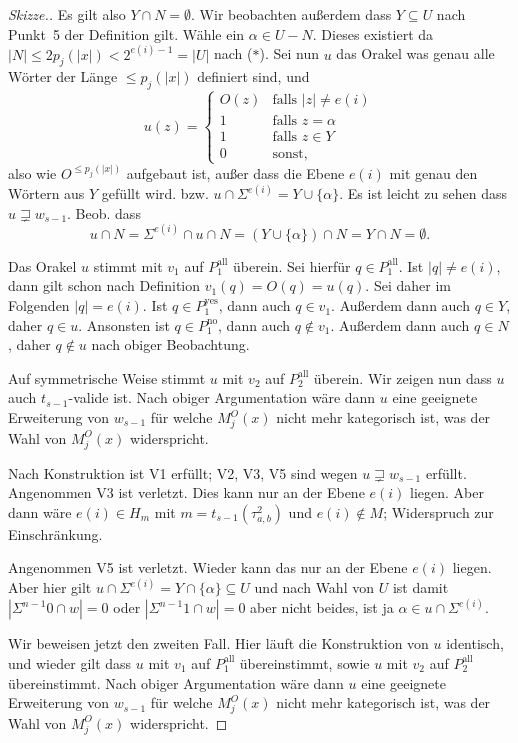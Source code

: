 \documentclass[nofonts]{uebung}
\begin{document}
\begin{proof}[Skizze.]
    Es gilt also $Y\cap N =\emptyset$. Wir beobachten außerdem dass $Y\subseteq U$ nach Punkt~5 der Definition gilt. Wähle ein $\alpha\in U-N$. Dieses existiert da $|N|\leq 2p_j(|x|)<2^{e(i)-1} = |U|$ nach ($\ast$).
    Sei nun $u$ das Orakel was genau alle Wörter der Länge $\leq p_j(|x|)$ definiert sind, und
    \[ u(z)= \begin{cases} O(z) & \text{falls $|z|\neq e(i)$}\\ 1 & \text{falls $z=\alpha$} \\1 & \text{falls $z\in Y$} \\ 0&\text{sonst,} \end{cases}
    \]
    also wie $O^{\leq p_j(|x|)}$ aufgebaut ist, außer dass die Ebene $e(i)$ mit genau den Wörtern aus $Y$ gefüllt wird. bzw. $u\cap\Sigma^{e(i)} = Y\cup \{\alpha\}$.
    Es ist leicht zu sehen dass $u\sqsupsetneq w_{s-1}$.
    Beob. dass 
    \[ u\cap N = \Sigma^{e(i)}\cap u \cap N = (Y\cup \{\alpha\}) \cap N= Y\cap N=\emptyset.\]

    Das Orakel $u$ stimmt mit $v_1$ auf $P^\mathrm{all}_1$ überein. Sei hierfür $q\in P^\mathrm{all}_1$.
    Ist $|q|\neq e(i)$, dann gilt schon nach Definition $v_1(q)=O(q)=u(q)$. Sei daher im Folgenden $|q|=e(i)$.
    Ist $q\in P^\mathrm{yes}_1$, dann auch $q\in v_1$. Außerdem dann auch $q\in Y$, daher $q\in u$.
    Ansonsten ist $q\in P^\mathrm{no}_1$, dann auch $q\not\in v_1$. Außerdem dann auch $q\in N$, daher $q\not\in u$ nach obiger Beobachtung.
    
    Auf symmetrische Weise stimmt $u$ mit $v_2$ auf $P^\mathrm{all}_2$ überein.
    Wir zeigen nun dass $u$ auch $t_{s-1}$-valide ist.
    Nach obiger Argumentation wäre dann $u$ eine geeignete Erweiterung von $w_{s-1}$ für welche $M_j^O(x)$ nicht mehr kategorisch ist, was der Wahl von $M_j^O(x)$ widerspricht.

    Nach Konstruktion ist V1 erfüllt; V2, V3, V5 sind wegen $u\sqsupsetneq w_{s-1}$ erfüllt. Angenommen V3 ist verletzt. Dies kann nur an der Ebene $e(i)$ liegen. Aber dann wäre $e(i)\in H_{m}$ mit $m=t_{s-1}(\tau^2_{a,b})$ und $e(i) \not\in M$; Widerspruch zur Einschränkung.

    Angenommen V5 ist verletzt.
    Wieder kann das nur an der Ebene $e(i)$ liegen.
    Aber hier gilt $u\cap\Sigma^{e(i)}=Y\cap\{\alpha\}\subseteq U$ und nach Wahl von $U$ ist damit $|\Sigma^{n-1}0\cap w|=0$ oder $|\Sigma^{n-1}1\cap w|=0$ aber nicht beides, ist ja $\alpha\in u\cap\Sigma^{e(i)}$.
    \medskip

    Wir beweisen jetzt den zweiten Fall. Hier läuft die Konstruktion von $u$ identisch,
    und wieder gilt dass $u$ mit $v_1$ auf $P^\mathrm{all}_1$ übereinstimmt, sowie $u$ mit $v_2$ auf $P^\mathrm{all}_2$ übereinstimmt.
    Nach obiger Argumentation wäre dann $u$ eine geeignete Erweiterung von $w_{s-1}$ für welche $M_j^O(x)$ nicht mehr kategorisch ist, was der Wahl von $M_j^O(x)$ widerspricht.


\end{proof}
\end{document}

